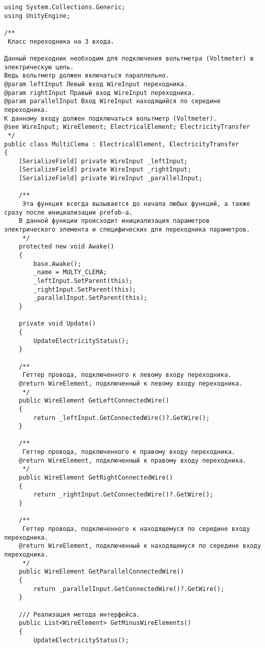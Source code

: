 \begin{verbatim}
﻿using System.Collections.Generic;
using UnityEngine;

/**
 Класс переходника на 3 входа.

Данный переходник необходим для подключения вольтметра (Voltmeter) в электрическую цепь.
Ведь вольтметр должен включаться параллельно.
@param leftInput Левый вход WireInput переходника.
@param rightInput Правый вход WireInput переходника.
@param parallelInput Вход WireInput находящийся по середине переходника. 
К данному входу должен подключаться вольтметр (Voltmeter).
@see WireInput; WireElement; ElectricalElement; ElectricityTransfer
 */
public class MultiClema : ElectricalElement, ElectricityTransfer
{
    [SerializeField] private WireInput _leftInput;
    [SerializeField] private WireInput _rightInput;
    [SerializeField] private WireInput _parallelInput;

    /**
     Эта функция всегда вызывается до начала любых функций, а также сразу после инициализации prefab-а.
    В данной функции происходит инициализация параметров электрического элемента и специфических для переходника параметров.
     */
    protected new void Awake()
    {
        base.Awake();
        _name = MULTY_CLEMA;
        _leftInput.SetParent(this);
        _rightInput.SetParent(this);
        _parallelInput.SetParent(this);
    }

    private void Update()
    {
        UpdateElectricityStatus();
    }

    /**
     Геттер провода, подключенного к левому входу переходника.
    @return WireElement, подключенный к левому входу переходника.
     */
    public WireElement GetLeftConnectedWire()
    {
        return _leftInput.GetConnectedWire()?.GetWire();
    }

    /**
     Геттер провода, подключенного к правому входу переходника.
    @return WireElement, подключенный к правому входу переходника.
     */
    public WireElement GetRightConnectedWire()
    {
        return _rightInput.GetConnectedWire()?.GetWire();
    }

    /**
     Геттер провода, подключенного к находящемуся по середине входу переходника.
    @return WireElement, подключенный к находящемуся по середине входу переходника.
     */
    public WireElement GetParallelConnectedWire()
    {
        return _parallelInput.GetConnectedWire()?.GetWire();
    }

    /// Реализация метода интерфейса.
    public List<WireElement> GetMinusWireElements()
    {
        UpdateElectricityStatus();


\end{verbatim}
